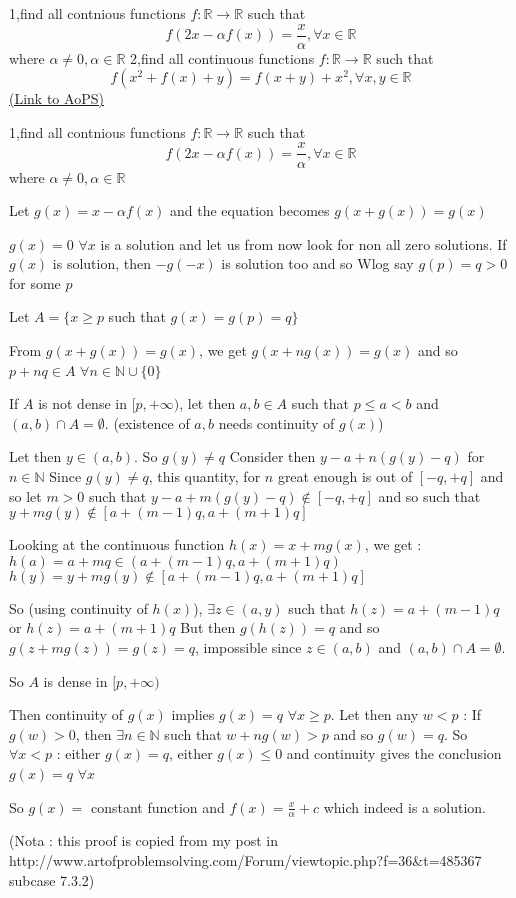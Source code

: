 \begin{problem}
	1,find all contnious functions $f:\mathbb{R}\to\mathbb{R}$ such that \[f\left(2x-\alpha f(x)\right)=\frac{x}{\alpha},\forall x\in\mathbb{R}\] where $\alpha\neq 0,\alpha\in\mathbb{R}$ 
2,find all continuous  functions $f:\mathbb{R}\to\mathbb{R}$ such that \[f(x^2+ f(x)+y)=f(x+y)+x^2,\forall x,y\in\mathbb{R}\]
	\flushright \href{https://artofproblemsolving.com/community/c6h527008}{(Link to AoPS)}
\end{problem}



\begin{solution}
	\begin{tcolorbox}1,find all contnious functions $f:\mathbb{R}\to\mathbb{R}$ such that \[f\left(2x-\alpha f(x)\right)=\frac{x}{\alpha},\forall x\in\mathbb{R}\] where $\alpha\neq 0,\alpha\in\mathbb{R}$ \end{tcolorbox}
Let $g(x)=x-\alpha f(x)$ and the equation becomes $g(x+g(x))=g(x)$

$g(x)=0$ $\forall x$ is a solution and let us from now look for non all zero solutions.
If $g(x)$ is solution, then $-g(-x)$ is solution too and so Wlog say $g(p)=q>0$ for some $p$

Let $A=\{x\ge p$ such that $g(x)=g(p)=q\}$

From $g(x+g(x))=g(x)$, we get $g(x+ng(x))=g(x)$ and so $p+nq\in A$ $\forall n\in\mathbb N\cup\{0\}$

If $A$ is not dense in $[p,+\infty)$, let then $a,b\in A$ such that $p\le a<b$ and $(a,b)\cap A=\emptyset$. (existence of $a,b$ needs continuity of $g(x)$)

Let then $y\in(a,b)$. So $g(y)\ne q$ 
Consider then $y-a+n(g(y)-q)$ for $n\in\mathbb N$
Since $g(y)\ne q$, this quantity, for $n$ great enough is out of $[-q,+q]$ and so let $m>0$ such that $y-a+m(g(y)-q)\notin[-q,+q]$ and so such that $y+mg(y)\notin[a+(m-1)q,a+(m+1)q]$

Looking at the continuous function $h(x)=x+mg(x)$, we get :
$h(a)=a+mq\in(a+(m-1)q,a+(m+1)q)$
$h(y)=y+mg(y)\notin[a+(m-1)q,a+(m+1)q]$

So (using continuity of $h(x)$), $\exists z\in(a,y)$ such that $h(z)=a+(m-1)q$ or $h(z)=a+(m+1)q$
But then $g(h(z))=q$ and so $g(z+mg(z))=g(z)=q$, impossible since $z\in(a,b)$ and $(a,b)\cap A=\emptyset$.

So $A$ is dense in $[p,+\infty)$

Then continuity of $g(x)$ implies $g(x)=q$ $\forall x\ge p$.
Let then any $w<p$ : If $g(w)>0$, then $\exists n\in\mathbb N$ such that $w+ng(w)>p$ and so $g(w)=q$. So $\forall x<p$ : either $g(x)=q$, either $g(x)\le 0$ and continuity gives the conclusion $g(x)=q$ $\forall x$

So $g(x)=$ constant function and $\boxed{f(x)=\frac{x}{\alpha}+c}$ which indeed is a solution.

(Nota : this proof is copied from my post in http://www.artofproblemsolving.com/Forum/viewtopic.php?f=36&t=485367 subcase 7.3.2)
\end{solution}



